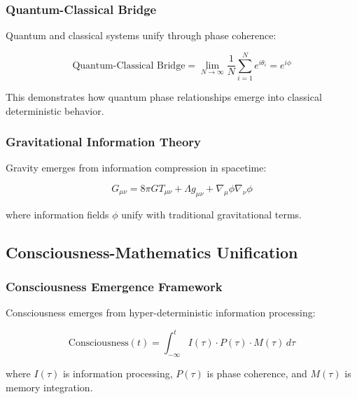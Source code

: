 \subsubsection{Quantum-Classical Bridge}

\begin{theorem}
Quantum and classical systems unify through phase coherence:

\begin{equation}
\text{Quantum-Classical Bridge} = \lim_{N \to \infty} \frac{1}{N} \sum_{i=1}^{N} e^{i\theta_i} = e^{i\phi}
\end{equation}

This demonstrates how quantum phase relationships emerge into classical deterministic behavior.
\end{theorem}

\subsubsection{Gravitational Information Theory}

\begin{theorem}
Gravity emerges from information compression in spacetime:

\begin{equation}
G_{\mu\nu} = 8\pi G T_{\mu\nu} + \Lambda g_{\mu\nu} + \nabla_\mu \phi \nabla_\nu \phi
\end{equation}

where information fields $\phi$ unify with traditional gravitational terms.
\end{theorem}

\subsection{Consciousness-Mathematics Unification}

\subsubsection{Consciousness Emergence Framework}

\begin{theorem}
Consciousness emerges from hyper-deterministic information processing:

\begin{equation}
\text{Consciousness}(t) = \int_{-\infty}^{t} I(\tau) \cdot P(\tau) \cdot M(\tau) \, d\tau
\end{equation}

where $I(\tau)$ is information processing, $P(\tau)$ is phase coherence, and $M(\tau)$ is memory integration.
\end{theorem}

